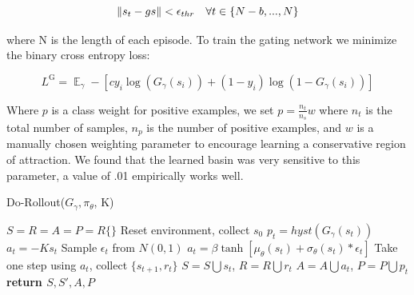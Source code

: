\documentclass[letterpaper, 10 pt, conference]{ieeeconf}
\begin{document}
\begin{dmath} \norm{s_{t} - gs } < \epsilon_{thr} \quad \forall t \in \{N-b, ...,  N \} \end{dmath}


where N is the length of each episode. To train the gating network we minimize the binary cross entropy loss:


\begin{dmath}L^{\text{G}} =  \mathop{\mathbb{E}}_{\gamma} -\left[ c y_{i}\log(G_{\gamma}(s_{i})) + (1 - y_{i})\log(1 - G_{\gamma}(s_{i})) \right]\end{dmath} 

Where $p$ is a class weight for positive examples, we set $p = \frac{n_{t}}{n_{s}}w $ where $n_{t}$ is the total number of samples, $n_{p}$ is the number of positive examples, and $w$ is a manually chosen weighting parameter to encourage learning a conservative region of attraction. We found that the learned basin was very sensitive to this parameter, a value of .01 empirically works well.




\begin{algorithm}
\caption{Do-Rollout($G_{\gamma}, \pi_{\theta}$, K)}
\begin{algorithmic}[1]
\State $S = R = A = P = R \{\}$
\State  Reset environment, collect $s_{0}$
\State  $p_{t} = hyst(G_{\gamma}(s_{t}))$ 
\State    $a_{t} = -Ks_{t}$
\Else
\State   Sample $\epsilon_{t}$ from $N(0, 1)$
\State   $a_{t} = \beta\tanh[\mu_{\theta}(s_{t}) + \sigma_{\theta}(s_{t})*\epsilon_{t}]$ 
\EndIf
\State   Take one step using $a_{t}$,  collect $\{s_{t+1}, r_{t}\}$
\State   $S = S \bigcup s_{t}$, $R = R \bigcup r_{t}$
\State   $A = A \bigcup a_{t}$,  $P = P \bigcup p_{t}$
\EndFor
\State \bf{return} $S,S',A,P$
\end{algorithmic}
\end{algorithm}
\end{document}
